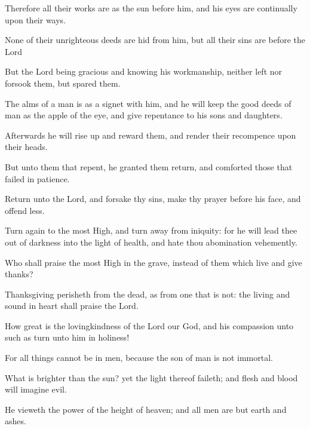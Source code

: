 {\par }{\PP {}Therefore all their works are as the sun before him, and his eyes are continually upon their ways.
\par }{\PP {}None of their unrighteous deeds are hid from him, but all their sins are before the Lord
\par }{\PP {}But the Lord being gracious and knowing his workmanship, neither left nor forsook them, but spared them.
\par }{\PP {}The alms of a man is as a signet with him, and he will keep the good deeds of man as the apple of the eye, and give repentance to his sons and daughters.
\par }{\PP {}Afterwards he will rise up and reward them, and render their recompence upon their heads.
\par }{\PP {}But unto them that repent, he granted them return, and comforted those that failed in patience.
\par }{\PP {}Return unto the Lord, and forsake thy sins, make thy prayer before his face, and offend less.
\par }{\PP {}Turn again to the most High, and turn away from iniquity: for he will lead thee out of darkness into the light of health, and hate thou abomination vehemently.
\par }{\PP {}Who shall praise the most High in the grave, instead of them which live and give thanks?
\par }{\PP {}Thanksgiving perisheth from the dead, as from one that is not: the living and sound in heart shall praise the Lord.
\par }{\PP {}How great is the lovingkindness of the Lord our God, and his compassion unto such as turn unto him in holiness!
\par }{\PP {}For all things cannot be in men, because the son of man is not immortal.
\par }{\PP {}What is brighter than the sun? yet the light thereof faileth; and flesh and blood will imagine evil.
\par }{\PP {}He vieweth the power of the height of heaven; and all men are but earth and ashes.

}
